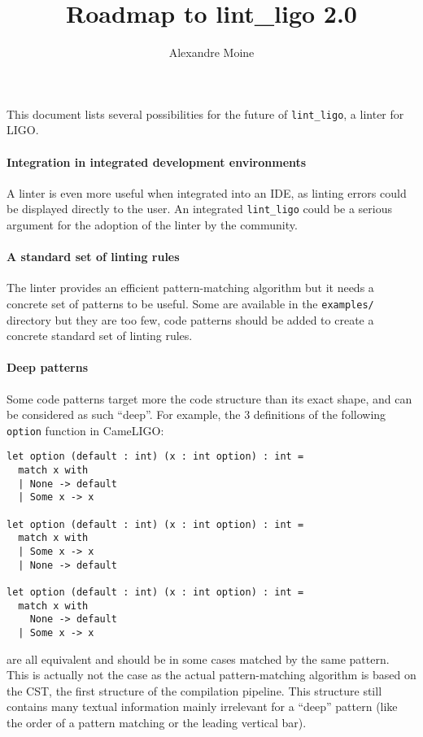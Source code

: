 \documentclass[10pt,a4paper]{article}
\author{Alexandre Moine}
\title{Roadmap to lint\_ligo 2.0}
\begin{document}
\maketitle

This document lists several possibilities for the future of \verb|lint_ligo|, a linter for LIGO.

\paragraph{Integration in integrated development environments}
A linter is even more useful when integrated into an IDE, as linting errors could be displayed directly to the user.
An integrated \verb|lint_ligo| could be a serious argument for the adoption of the linter by the community.

\paragraph{A standard set of linting rules}

The linter provides an efficient pattern-matching algorithm but it needs a concrete set of patterns to be useful. Some are available in the \verb|examples/| directory but they are too few, code patterns should be added to create a concrete standard set of linting rules.

\paragraph{Deep patterns}
Some code patterns target more the code structure than its exact shape, and can be considered as such ``deep''. For example, the 3 definitions of the following \verb|option| function in CameLIGO:
\begin{verbatim}
let option (default : int) (x : int option) : int =
  match x with
  | None -> default
  | Some x -> x

let option (default : int) (x : int option) : int =
  match x with
  | Some x -> x
  | None -> default

let option (default : int) (x : int option) : int =
  match x with
    None -> default
  | Some x -> x
\end{verbatim}

are all equivalent and should be in some cases matched by the same pattern.\\
This is actually not the case as the actual pattern-matching algorithm is based on the CST, the first structure of the compilation pipeline. This structure still contains many textual information mainly irrelevant for a ``deep'' pattern (like the order of a pattern matching or the leading vertical bar).
\end{document}
